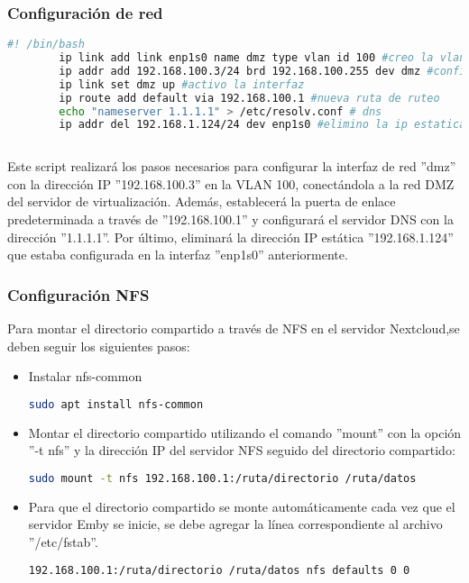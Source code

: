 		\subsubsection{Configuración de red}
	
			\begin{lstlisting}[language=Bash, caption=Red]
		#! /bin/bash
		ip link add link enp1s0 name dmz type vlan id 100 #creo la vlan
		ip addr add 192.168.100.3/24 brd 192.168.100.255 dev dmz #configuro la ip
		ip link set dmz up #activo la interfaz
		ip route add default via 192.168.100.1 #nueva ruta de ruteo
		echo "nameserver 1.1.1.1" > /etc/resolv.conf # dns
		ip addr del 192.168.1.124/24 dev enp1s0 #elimino la ip estatica anterio
		
			\end{lstlisting}

			Este script realizará los pasos necesarios para configurar la interfaz de red ''dmz'' con la dirección IP ''192.168.100.3'' en la VLAN 100, conectándola a la red DMZ del servidor de virtualización. Además, establecerá la puerta de enlace predeterminada a través de ''192.168.100.1'' y configurará el servidor DNS con la dirección ''1.1.1.1''. Por último, eliminará la dirección IP estática ''192.168.1.124'' que estaba configurada en la interfaz ''enp1s0'' anteriormente.
			
			\subsubsection{Configuración NFS}
			Para montar el directorio compartido a través de NFS en el servidor Nextcloud,se deben seguir los siguientes pasos:
			
			\begin{itemize}
				\item Instalar nfs-common
				\begin{lstlisting}[language=Bash, caption=nfs-common]
					sudo apt install nfs-common
				\end{lstlisting}
				
				\item Montar el directorio compartido utilizando el comando ''mount'' con la opción ''-t nfs'' y la dirección IP del servidor NFS seguido del directorio compartido:
				\begin{lstlisting}[language=Bash, caption=mount]
			sudo mount -t nfs 192.168.100.1:/ruta/directorio /ruta/datos
				\end{lstlisting}
				
				\item Para que el directorio compartido se monte automáticamente cada vez que el servidor Emby se inicie, se debe agregar la línea correspondiente al archivo ''/etc/fstab''.
				\begin{lstlisting}[language=Bash, caption=fstab]
			192.168.100.1:/ruta/directorio /ruta/datos nfs defaults 0 0
				\end{lstlisting}	
			\end{itemize}
		
